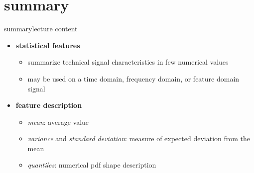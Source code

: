         
    \section{summary}
        \begin{frame}{summary}{lecture content}
            \begin{itemize}
                \item   \textbf{statistical features}  
                    \begin{itemize}
                        \item  summarize technical signal characteristics in few numerical values 
                        \item   may be used on a time domain, frequency domain, or feature domain signal
                    \end{itemize}
                \bigskip
                \item   \textbf{feature description}
                    \begin{itemize}
                        \item   \textit{mean}: average value
                        \item   \textit{variance} and \textit{standard deviation}: measure of expected deviation from the mean
                        \item   \textit{quantiles}: numerical pdf shape description
                    \end{itemize}
            \end{itemize}
        \end{frame}

